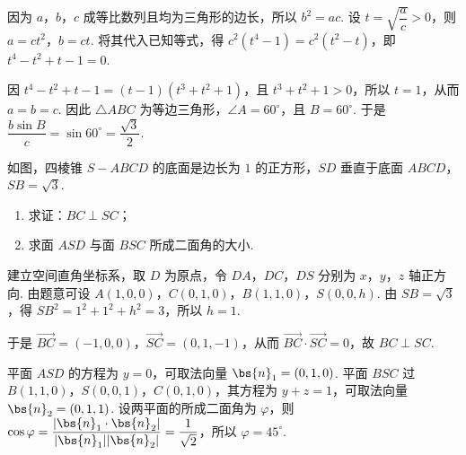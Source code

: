 \begin{solution}
因为 \(a\)，\(b\)，\(c\) 成等比数列且均为三角形的边长，所以 \(b^{2}=ac\). 设 \(t=\sqrt{\dfrac{a}{c}}>0\)，则 \(a=ct^{2}\)，\(b=ct\). 将其代入已知等式，得 \(c^{2}(t^{4}-1)=c^{2}(t^{2}-t)\)，即 \(t^{4}-t^{2}+t-1=0\).

因 \(t^{4}-t^{2}+t-1=(t-1)(t^{3}+t^{2}+1)\)，且 \(t^{3}+t^{2}+1>0\)，所以 \(t=1\)，从而 \(a=b=c\). 因此 \(\triangle ABC\) 为等边三角形，\(\angle A=60^{\circ}\)，且 \(B=60^{\circ}\). 于是 \(\dfrac{b\sin B}{c}=\sin60^{\circ}=\dfrac{\sqrt3}{2}\).
\end{solution}

\begin{problem}
如图，四棱锥 \(S-ABCD\) 的底面是边长为 \(1\) 的正方形，\(SD\) 垂直于底面 \(ABCD\)，\(SB=\sqrt3\).

\begin{enumerate}
\item 求证：\(BC\perp SC\)；
\item 求面 \(ASD\) 与面 \(BSC\) 所成二面角的大小.
\end{enumerate}

\FloatBarrier
\end{problem}

\begin{solution}
建立空间直角坐标系，取 \(D\) 为原点，令 \(DA\)，\(DC\)，\(DS\) 分别为 \(x\)，\(y\)，\(z\) 轴正方向. 由题意可设 \(A\left(1,0,0\right)\)，\(C\left(0,1,0\right)\)，\(B\left(1,1,0\right)\)，\(S\left(0,0,h\right)\). 由 \(SB=\sqrt3\)，得 \(SB^{2}=1^{2}+1^{2}+h^{2}=3\)，所以 \(h=1\).

于是 \(\overrightarrow{BC}=\left(-1,0,0\right)\)，\(\overrightarrow{SC}=\left(0,1,-1\right)\)，从而 \(\overrightarrow{BC}\cdot\overrightarrow{SC}=0\)，故 \(BC\perp SC\).

平面 \(ASD\) 的方程为 \(y=0\)，可取法向量 \(\bs{n}_{1}=\left(0,1,0\right)\). 平面 \(BSC\) 过 \(B\left(1,1,0\right)\)，\(S\left(0,0,1\right)\)，\(C\left(0,1,0\right)\)，其方程为 \(y+z=1\)，可取法向量 \(\bs{n}_{2}=\left(0,1,1\right)\). 设两平面的所成二面角为 \(\varphi\)，则 \(\cos\varphi=\dfrac{|\bs{n}_{1}\cdot\bs{n}_{2}|}{|\bs{n}_{1}||\bs{n}_{2}|}=\dfrac{1}{\sqrt2}\)，所以 \(\varphi=45^{\circ}\).
\end{solution}

